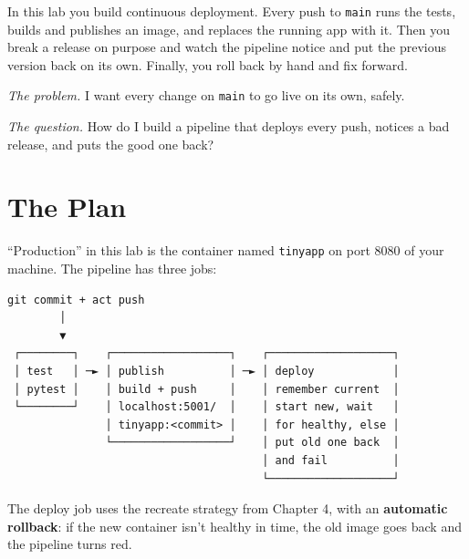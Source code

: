 
\begin{chapterintro}

In this lab you build continuous deployment. Every push to \texttt{main} runs the tests, builds and publishes an image, and replaces the running app with it. Then you break a release on purpose and watch the pipeline notice and put the previous version back on its own. Finally, you roll back by hand and fix forward.

\end{chapterintro}

\emph{The problem.} I want every change on \texttt{main} to go live on its own, safely.

\emph{The question.} How do I build a pipeline that deploys every push, notices a bad release, and puts the good one back?


\section{The Plan}\label{10-lab-deploy-on-every-push:the-plan}

``Production'' in this lab is the container named \texttt{tinyapp} on port 8080 of your machine. The pipeline has three jobs:

\begin{codeblock}
\begin{Verbatim}[breaklines=false, fontsize=\fontsize{8.8}{8.68}\selectfont, fontfamily=diagrammono, formatcom=\diagramlines]
 git commit + act push
        │
        ▼
 ┌────────┐    ┌──────────────────┐    ┌───────────────────┐
 │ test   │ ─► │ publish          │ ─► │ deploy            │
 │ pytest │    │ build + push     │    │ remember current  │
 └────────┘    │ localhost:5001/  │    │ start new, wait   │
               │ tinyapp:<commit> │    │ for healthy, else │
               └──────────────────┘    │ put old one back  │
                                       │ and fail          │
                                       └───────────────────┘
\end{Verbatim}
\end{codeblock}

The deploy job uses the recreate strategy from Chapter 4, with an \textbf{automatic rollback}: if the new container isn't healthy in time, the old image goes back and the pipeline turns red.

